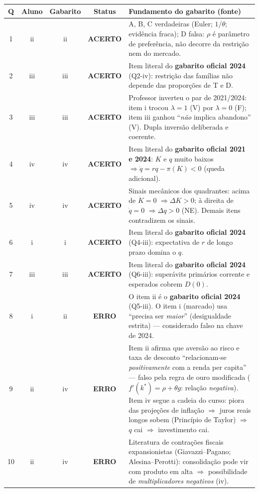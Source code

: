 \documentclass[12pt, a4paper]{article}
\newcommand{\ok}{\textbf{\textcolor{greenbox}{ACERTO}}}
\newcommand{\erro}{\textbf{\textcolor{redf}{ERRO}}}
\begin{document}
\renewcommand{\arraystretch}{1.35}
{\small
\begin{tabular}{c c c c p{8.6cm}}
\toprule
\textbf{Q} & \textbf{Aluno} & \textbf{Gabarito} & \textbf{Status} &
\textbf{Fundamento do gabarito (fonte)} \\
\midrule
1 & ii & ii & \ok & A, B, C verdadeiras (Euler; $1/\theta$; evidência fraca);
D falsa: $\rho$ é parâmetro de preferência, não decorre da restrição nem do
mercado. \\
2 & iii & iii & \ok & Item literal do \textbf{gabarito oficial 2024} (Q2-iv):
restrição das famílias não depende das proporções de T e D. \\
3 & iii & iii & \ok & Professor inverteu o par de 2021/2024: item i trocou
$\lambda=1$ (V) por $\lambda=0$ (F); item iii ganhou ``\emph{não} implica
abandono'' (V). Dupla inversão deliberada e coerente. \\
4 & iv & iv & \ok & Item literal do \textbf{gabarito oficial 2021 e 2024}:
$K$ e $q$ muito baixos $\Rightarrow \dot q = rq - \pi(K) < 0$ (queda
adicional). \\
5 & iv & iv & \ok & Sinais mecânicos dos quadrantes: acima de $\dot K{=}0$
$\Rightarrow \Delta K{>}0$; à direita de $\dot q{=}0$
$\Rightarrow \Delta q{>}0$ (NE). Demais itens contradizem os sinais. \\
6 & i & i & \ok & Item literal do \textbf{gabarito oficial 2024} (Q4-iii):
expectativa de $r$ de longo prazo domina o $q$. \\
7 & iii & iii & \ok & Item literal do \textbf{gabarito oficial 2024} (Q6-iii):
superávits primários corrente e esperados cobrem $D(0)$. \\
8 & i & ii & \erro & O item ii é o \textbf{gabarito oficial 2024} (Q5-iii).
O item i (marcado) usa ``precisa ser \emph{maior}'' (desigualdade estrita)
--- considerado falso na chave de 2024. \\
9 & ii & iv & \erro & Item ii afirma que aversão ao risco e taxa de desconto
``relacionam-se \emph{positivamente} com a renda per capita'' --- falso pela
regra de ouro modificada ($f'(k^*) = \rho + \theta g$: relação
\emph{negativa}). Item iv segue a cadeia do curso: piora das projeções de
inflação $\Rightarrow$ juros reais longos sobem (Princípio de Taylor)
$\Rightarrow$ $q$ cai $\Rightarrow$ investimento cai. \\
10 & ii & iv & \erro & Literatura de contrações fiscais expansionistas
(Giavazzi--Pagano; Alesina--Perotti): consolidação pode vir com produto em
alta $\Rightarrow$ possibilidade de \emph{multiplicadores negativos} (iv).

\end{tabular}}
\end{document}
